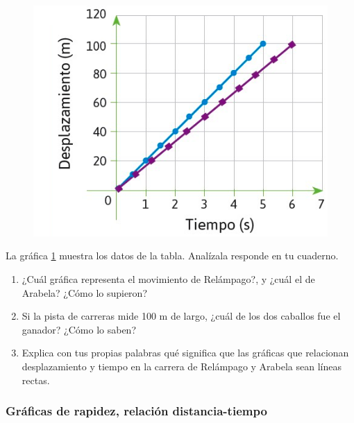 \documentclass[11pt]{book}
\begin{document}
\begin{minipage}[t]{0.5\linewidth}
  \begin{figure}[H]
    \centering
    \includegraphics[width=\linewidth]{caballos_fig.jpg}
    \label{fig:caballos_fig}
  \end{figure}
\end{minipage}
\begin{minipage}[t]{0.5\linewidth}
  La gráfica \ref{fig:caballos_fig} muestra los datos de la tabla. Analízala  responde en tu cuaderno.
  \begin{enumerate}
    \item ¿Cuál gráfica representa el movimiento de Relámpago?, y ¿cuál el de Arabela?
          ¿Cómo lo supieron?\\[1cm]
    \item Si la pista de carreras mide 100 m de largo, ¿cuál de los dos caballos fue el ganador?
          ¿Cómo lo saben?\\[1cm]
    \item Explica con tus propias palabras qu\'e significa que las gr\'aficas que relacionan
          desplazamiento y tiempo en la carrera de Relámpago y Arabela sean líneas rectas.\\[1cm]
  \end{enumerate}
\end{minipage}

\subsubsection{Gráficas de rapidez, relación distancia-tiempo}
\end{document}
